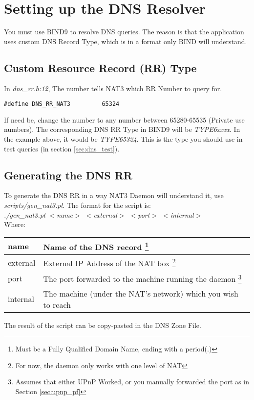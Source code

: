 \section{Setting up the DNS Resolver}

You must use BIND9 to resolve DNS queries. The reason is that the application uses custom DNS Record Type, which is in a format only BIND will understand.

\subsection{Custom Resource Record (RR) Type}
\label{sec:rr_type}
In \textit{dns\_rr.h:12}, The number tells NAT3 which RR Number to query for. \\
\begin{verbatim}
#define DNS_RR_NAT3         65324
\end{verbatim}

If need be, change the number to any number between 65280-65535 (Private use numbers). The corresponding DNS RR Type in BIND9 will be \textit{TYPE6xxxx}. In the example above, it would be \textit{TYPE65324}. This is the type you should use in test queries (in section \ref{sec:dns_test}).\\




\subsection{Generating the DNS RR}
\label{sec:gen_dns_rr}
To generate the DNS RR in a way NAT3 Daemon will understand it, use \textit{scripts/gen\_nat3.pl}. The format for the script is:\\
\textit{./gen\_nat3.pl $<$name$>$ $<$external$>$ $<$port$>$ $<$internal$>$} \\

Where: \\
\begin{minipage}{\textwidth}
\begin{tabular}{| l | p{4in} |}
            \hline
name     & Name of the DNS record \footnote{Must be a Fully Qualified Domain Name, ending with a period(.)}\\
            \hline
external & External IP Address of the NAT box \footnote{For now, the daemon only works with one level of NAT}\\
            \hline
port     & The port forwarded to the machine running the daemon \footnote{Assumes that either UPnP Worked, or you manually forwarded the port as in Section \ref{sec:upnp_pf} }\\
            \hline
internal & The machine (under the NAT's network) which you wish to reach \\
            \hline
\end{tabular}
\end{minipage}
\newline
The result of the script can be copy-pasted in the DNS Zone File.\\

